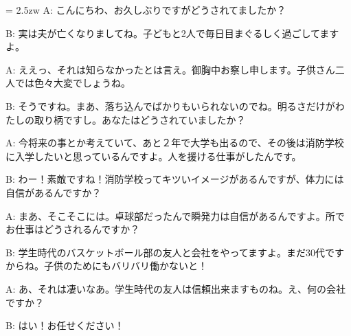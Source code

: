 \documentclass[11pt]{amsart}
\title{}
\author{}
\newenvironment{hangall}[1]{\hangindent = 2.5zw\everypar{\hangindent = 2.5zw}}{}
\begin{document}
\maketitle
\begin{hangall}{}%
A: こんにちわ、お久しぶりですがどうされてましたか？



B: 実は夫が亡くなりましてね。子どもと2人で毎日目まぐるしく過ごしてますよ。



A: ええっ、それは知らなかったとは言え。御胸中お察し申します。子供さん二人では色々大変でしょうね。



B: そうですね。まあ、落ち込んでばかりもいられないのでね。明るさだけがわたしの取り柄ですし。あなたはどうされていましたか？



A: 今将来の事とか考えていて、あと２年で大学も出るので、その後は消防学校に入学したいと思っているんですよ。人を援ける仕事がしたんです。



B: わー！素敵ですね！消防学校ってキツいイメージがあるんですが、体力には自信があるんですか？



A: まあ、そこそこには。卓球部だったんで瞬発力は自信があるんですよ。所でお仕事はどうされるんですか？



B: 学生時代のバスケットボール部の友人と会社をやってますよ。まだ30代ですからね。子供のためにもバリバリ働かないと！



A: あ、それは凄いなあ。学生時代の友人は信頼出来ますものね。え、何の会社ですか？



B: はい！お任せください！\end{hangall}
\end{document}
